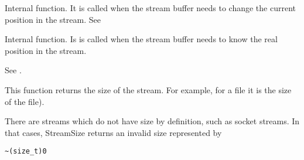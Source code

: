 

Internal function. It is called when the stream buffer needs to change the
current position in the stream. See 



Internal function. Is is called when the stream buffer needs to know the
real position in the stream.



See .



This function returns the size of the stream. For example, for a file it is the size of
the file).


There are streams which do not have size by definition, such as socket streams.
In that cases, StreamSize returns an invalid size represented by

\begin{verbatim}
~(size_t)0
\end{verbatim}


